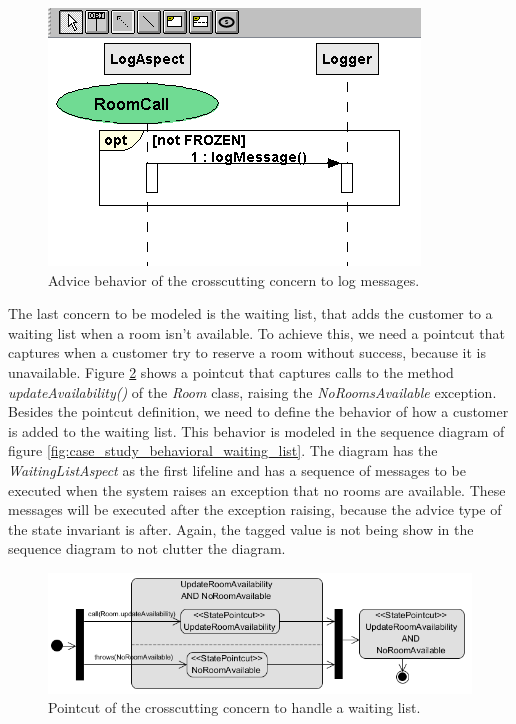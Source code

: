   \begin{figure}[tb]
	\centering
	\includegraphics[scale=0.6]{img/case_study_behavioral_log.png}
	\caption{Advice behavior of the crosscutting concern to log messages.}\label{fig:case_study_behavioral_log}
  \end{figure}

The last concern to be modeled is the waiting list, that adds the customer to a waiting list when a room isn't available. To achieve this, we need a
pointcut that captures when a customer try to reserve a room without success, because it is unavailable. Figure
\ref{fig:case_study_behavioral_pointcut_waiting_list} shows a pointcut that captures calls to the method \textit{updateAvailability()} of the
\textit{Room} class, raising the \textit{NoRoomsAvailable} exception. Besides the pointcut definition, we need to define the behavior of how a
customer is added to the waiting list. This behavior is modeled in the sequence diagram of figure \ref{fig:case_study_behavioral_waiting_list}. The
diagram has the \textit{WaitingListAspect} as the first lifeline and has a sequence of messages to be executed when the system raises an exception
that no rooms are available. These messages will be executed after the exception raising, because the advice type of the state invariant is after.
Again, the tagged value is not being show in the sequence diagram to not clutter the diagram.

  \begin{figure}[tb]
	\centering
	\includegraphics[scale=0.6]{img/case_study_behavioral_pointcut_waiting_list.png}
	\caption{Pointcut of the crosscutting concern to handle a waiting list.}\label{fig:case_study_behavioral_pointcut_waiting_list}
  \end{figure}
  

